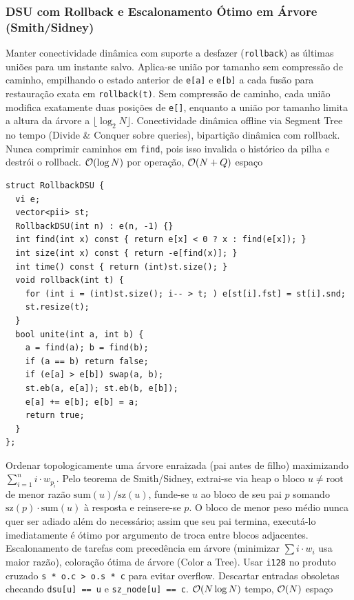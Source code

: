\subsubsection{DSU com Rollback e Escalonamento Ótimo em Árvore (Smith/Sidney)}
\algobox
  {Manter conectividade dinâmica com suporte a desfazer (\texttt{rollback}) as últimas uniões para um instante salvo.}
  {Aplica-se união por tamanho sem compressão de caminho, empilhando o estado anterior de \texttt{e[a]} e \texttt{e[b]} a cada fusão para restauração exata em \texttt{rollback(t)}.}
  {Sem compressão de caminho, cada união modifica exatamente duas posições de \texttt{e[]}, enquanto a união por tamanho limita a altura da árvore a $\lfloor \log_2 N \rfloor$.}
  {Conectividade dinâmica offline via Segment Tree no tempo (Divide \& Conquer sobre queries), bipartição dinâmica com rollback.}
  {Nunca comprimir caminhos em \texttt{find}, pois isso invalida o histórico da pilha e destrói o rollback.}
  {$\mathcal{O}(\log N)$ por operação, $\mathcal{O}(N + Q)$ espaço}

\begin{lstlisting}
struct RollbackDSU {
  vi e;
  vector<pii> st;
  RollbackDSU(int n) : e(n, -1) {}
  int find(int x) const { return e[x] < 0 ? x : find(e[x]); }
  int size(int x) const { return -e[find(x)]; }
  int time() const { return (int)st.size(); }
  void rollback(int t) {
    for (int i = (int)st.size(); i-- > t; ) e[st[i].fst] = st[i].snd;
    st.resize(t);
  }
  bool unite(int a, int b) {
    a = find(a); b = find(b);
    if (a == b) return false;
    if (e[a] > e[b]) swap(a, b);
    st.eb(a, e[a]); st.eb(b, e[b]);
    e[a] += e[b]; e[b] = a;
    return true;
  }
};
\end{lstlisting}

\algobox
  {Ordenar topologicamente uma árvore enraizada (pai antes de filho) maximizando $\sum_{i=1}^n i \cdot w_{p_i}$.}
  {Pelo teorema de Smith/Sidney, extrai-se via heap o bloco $u \neq \text{root}$ de menor razão $\text{sum}(u)/\text{sz}(u)$, funde-se $u$ ao bloco de seu pai $p$ somando $\text{sz}(p) \cdot \text{sum}(u)$ à resposta e reinsere-se $p$.}
  {O bloco de menor peso médio nunca quer ser adiado além do necessário; assim que seu pai termina, executá-lo imediatamente é ótimo por argumento de troca entre blocos adjacentes.}
  {Escalonamento de tarefas com precedência em árvore (minimizar $\sum i \cdot w_i$ usa maior razão), coloração ótima de árvore (Color a Tree).}
  {Usar \texttt{i128} no produto cruzado \texttt{s * o.c > o.s * c} para evitar overflow. Descartar entradas obsoletas checando \texttt{dsu[u] == u} e \texttt{sz\_node[u] == c}.}
  {$\mathcal{O}(N \log N)$ tempo, $\mathcal{O}(N)$ espaço}

